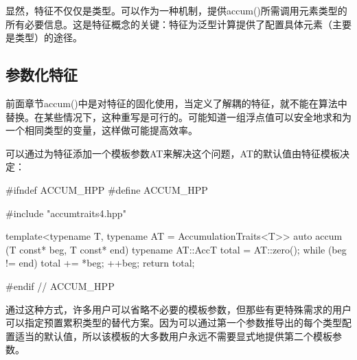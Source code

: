 显然，特征不仅仅是类型。可以作为一种机制，提供accum()所需调用元素类型的所有必要信息。这是特征概念的关键：特征为泛型计算提供了配置具体元素（主要是类型）的途径。

\subsection{参数化特征}

前面章节accum()中是对特征的固化使用，当定义了解耦的特征，就不能在算法中替换。在某些情况下，这种重写是可行的。可能知道一组浮点值可以安全地求和为一个相同类型的变量，这样做可能提高效率。

可以通过为特征添加一个模板参数AT来解决这个问题，AT的默认值由特征模板决定：

\begin{cpp}
#ifndef ACCUM_HPP
#define ACCUM_HPP

#include "accumtraits4.hpp"

template<typename T, typename AT = AccumulationTraits<T>>
auto accum (T const* beg, T const* end)
{
	typename AT::AccT total = AT::zero();
	while (beg != end) {
		total += *beg;
		++beg;
	}
	return total;
}

#endif // ACCUM_HPP
\end{cpp}

通过这种方式，许多用户可以省略不必要的模板参数，但那些有更特殊需求的用户可以指定预置累积类型的替代方案。因为可以通过第一个参数推导出的每个类型配置适当的默认值，所以该模板的大多数用户永远不需要显式地提供第二个模板参数。









